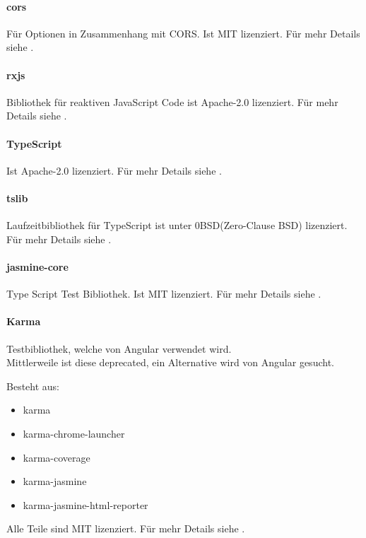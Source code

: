 \paragraph{cors}
Für Optionen in Zusammenhang mit CORS.
Ist MIT lizenziert.
Für mehr Details siehe .

\paragraph{rxjs}
Bibliothek für reaktiven JavaScript Code
ist Apache-2.0 lizenziert.
Für mehr Details siehe .

\paragraph{TypeScript}
Ist Apache-2.0 lizenziert.
Für mehr Details siehe .

\paragraph{tslib}
Laufzeitbibliothek für TypeScript
ist unter 0BSD(Zero-Clause BSD) lizenziert.
Für mehr Details siehe .


\paragraph{jasmine-core}
Type Script Test Bibliothek.
Ist MIT lizenziert.
Für mehr Details siehe .

\paragraph{Karma}
Testbibliothek, welche von Angular verwendet wird.\\
Mittlerweile ist diese deprecated, ein Alternative wird von Angular gesucht.

Besteht aus:
\begin{itemize}
    \item karma
    \item karma-chrome-launcher
    \item karma-coverage
    \item karma-jasmine
    \item karma-jasmine-html-reporter
\end{itemize}

Alle Teile sind MIT lizenziert.
Für mehr Details siehe .


